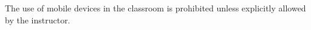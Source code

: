         The use of mobile devices in the classroom is prohibited unless explicitly allowed by the instructor.
